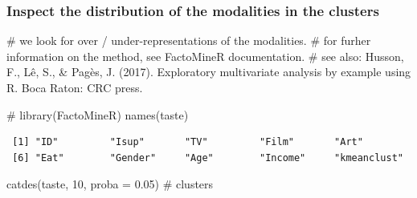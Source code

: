 \documentclass[
  letterpaper,
  DIV=11,
  numbers=noendperiod]{scrartcl}
\newenvironment{Shaded}{\begin{snugshade}}{\end{snugshade}}
\newcommand{\AttributeTok}[1]{\textcolor[rgb]{0.40,0.45,0.13}{#1}}
\newcommand{\CommentTok}[1]{\textcolor[rgb]{0.37,0.37,0.37}{#1}}
\newcommand{\DecValTok}[1]{\textcolor[rgb]{0.68,0.00,0.00}{#1}}
\newcommand{\FloatTok}[1]{\textcolor[rgb]{0.68,0.00,0.00}{#1}}
\newcommand{\FunctionTok}[1]{\textcolor[rgb]{0.28,0.35,0.67}{#1}}
\newcommand{\NormalTok}[1]{\textcolor[rgb]{0.00,0.23,0.31}{#1}}
\begin{document}
\normalsize

\subsubsection{Inspect the distribution of the modalities in the
clusters}\label{inspect-the-distribution-of-the-modalities-in-the-clusters}

\scriptsize

\begin{Shaded}
\begin{Highlighting}[]
\CommentTok{\# we look for over / under{-}representations of the modalities. }
\CommentTok{\# for furher information on the method, see FactoMineR documentation. }
\CommentTok{\# see also: Husson, F., Lê, S., \& Pagès, J. (2017). Exploratory multivariate analysis by example using R. Boca Raton: CRC press.}

\CommentTok{\# library(FactoMineR)}
\FunctionTok{names}\NormalTok{(taste)}
\end{Highlighting}
\end{Shaded}

\begin{verbatim}
 [1] "ID"         "Isup"       "TV"         "Film"       "Art"       
 [6] "Eat"        "Gender"     "Age"        "Income"     "kmeanclust"
\end{verbatim}

\begin{Shaded}
\begin{Highlighting}[]
\FunctionTok{catdes}\NormalTok{(taste, }\DecValTok{10}\NormalTok{, }\AttributeTok{proba =} \FloatTok{0.05}\NormalTok{) }\CommentTok{\# clusters}
\end{Highlighting}
\end{Shaded}
\end{document}
